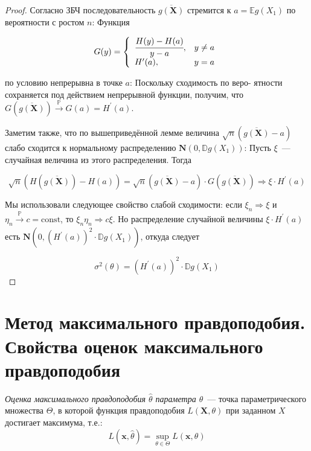 \begin{proof}
Согласно ЗБЧ последовательность $\overline{g(\mathbf{X})}$ стремится к $a=\mathbb{E} g\left(X_{1}\right)$ по вероятности с ростом $n$: Функция

\begin{equation*}
    G(y)=\left\{\begin{array}{ll}
    \cfrac{H(y)-H(a)}{y-a}, & y \neq a \\
    H^{\prime}(a), & y=a
    \end{array}\right.  
\end{equation*}

по условию непрерывна в точке $a$: Поскольку сходимость по веро-
ятности сохраняется под действием непрерывной функции, получим,
что $G(\overline{g(\mathbf{X})}) \xrightarrow[]{\mathbb{P}} G(a)=H^{\prime}(a)$.

Заметим также, что по вышеприведённой лемме величина $\sqrt{n}(\overline{g(\mathbf{X})}-a)$ слабо сходится
к нормальному распределению $\mathbf{N}(0, \mathbb{D} g(X_{1}))$: Пусть $\xi$~--- случайная величина
из этого распределения. Тогда

\begin{equation*}
    \sqrt{n}(H(\overline{g(\mathbf{X})})-H(a))=\sqrt{n}(\overline{g(\mathbf{X})}-a) \cdot G(\overline{g(\mathbf{X})}) \Rightarrow \xi \cdot H^{\prime}(a)
\end{equation*}

Мы использовали следующее свойство слабой сходимости: если $\xi_{n} \Rightarrow \xi$ и $\eta_{n} \xrightarrow[]{\mathbb{P}} c=\mathrm{const}$, то $\xi_{n} \eta_{n} \Rightarrow c \xi$. Но распределение случайной величины $\xi \cdot H^{\prime}(a)$ есть $\mathbf{N}(0,(H^{\prime}(a))^{2} \cdot \mathbb{D} g(X_{1}))$, откуда следует

\begin{equation*}
    \sigma^{2}(\theta)=\left(H^{\prime}(a)\right)^{2} \cdot \mathbb{D} g\left(X_{1}\right)
\end{equation*}

\end{proof}

\section{Метод максимального правдоподобия. Свойства оценок максимального правдоподобия}

\begin{defn}
{\it Оценка максимального правдоподобия $\hat{\theta}$ параметра $\theta$}~--- точка параметрического множества $\Theta$, в которой функция правдоподобия $L(\mathbf{X},\theta)$ при заданном $X$ достигает максимума, т.е.:
\begin{equation*}
    L(\boldsymbol{x}, \hat{\theta})=\sup\limits_{\theta \in \Theta} L(\boldsymbol{x}, \theta)
\end{equation*}
\end{defn}

